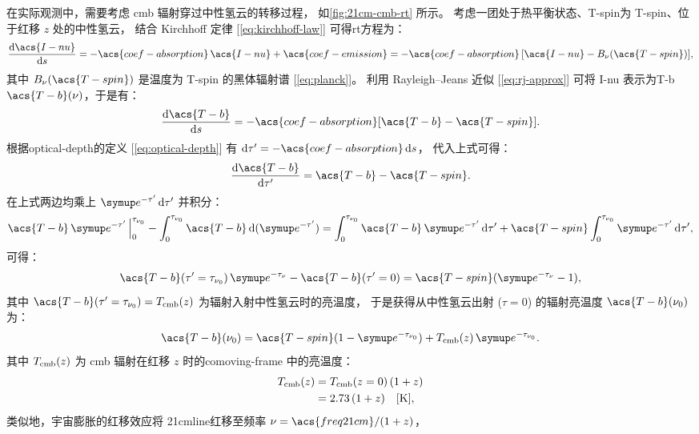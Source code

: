 在实际观测中，需要考虑 \ac{cmb} 辐射穿过中性氢云的转移过程，
如\autoref{fig:21cm-cmb-rt} 所示。
考虑一团处于热平衡状态、\acl{T-spin}为 \acs{T-spin}、位于红移 $z$ 处的中性氢云，
结合 Kirchhoff 定律 [\autoref{eq:kirchhoff-law}] 可得\ac{rt}方程为：
\begin{equation}
  \diff{\acs{I-nu}}{s}
    = -\acs{coef-absorption}\,\acs{I-nu} + \acs{coef-emission}
    = -\acs{coef-absorption}\,[\acs{I-nu} - B_{\nu}(\acs{T-spin})] ,
\end{equation}
其中
$B_{\nu}(\acs{T-spin})$ 是温度为 \acs{T-spin} 的黑体辐射谱 [\autoref{eq:planck}]。
利用 Rayleigh--Jeans 近似 [\autoref{eq:rj-approx}]
可将 \acs{I-nu} 表示为\acl{T-b} $\acs{T-b}(\nu)$，于是有：
\begin{equation}
  \diff{\acs{T-b}}{s}
    = -\acs{coef-absorption} [\acs{T-b} - \acs{T-spin}] .
\end{equation}
根据\acl{optical-depth}的定义 [\autoref{eq:optical-depth}]
有 $\D{\tau'} = -\acs{coef-absorption}\,\D{s}$，
代入上式可得：
\begin{equation}
  \diff{\acs{T-b}}{\tau'} = \acs{T-b} - \acs{T-spin} .
\end{equation}
在上式两边均乘上 $\Ce^{-\tau'}\,\D{\tau'}$ 并积分：
\begin{equation}
  \acs{T-b}\,\Ce^{-\tau'}\,\Big|_0^{\tau_{\nu_0}}
      - \int_0^{\tau_{\nu_0}} \acs{T-b}\,\D{(\Ce^{-\tau'})}
    = \int_0^{\tau_{\nu_0}} \acs{T-b}\,\Ce^{-\tau'}\,\D{\tau'}
      + \acs{T-spin} \int_0^{\tau_{\nu_0}} \Ce^{-\tau'}\,\D{\tau'} ,
\end{equation}
可得：
\begin{equation}
  \acs{T-b}(\tau'=\tau_{\nu_0})\,\Ce^{-\tau_{\nu}} - \acs{T-b}(\tau'=0)
    = \acs{T-spin} (\Ce^{-\tau_{\nu}} - 1) ,
\end{equation}
其中 $\acs{T-b}(\tau'=\tau_{\nu_0}) = T_{\R{cmb}}(z)$
为辐射入射中性氢云时的亮温度，
于是获得从中性氢云出射 ($\tau = 0$) 的辐射亮温度 $\acs{T-b}(\nu_0)$ 为：
\begin{equation}
  \acs{T-b}(\nu_0)
    = \acs{T-spin} (1 - \Ce^{-\tau_{\nu_0}})
      + T_{\R{cmb}}(z) \,\Ce^{-\tau_{\nu_0}} .
\end{equation}
其中 $T_{\mathrm{cmb}}(z)$ 为 \ac{cmb} 辐射在红移 $z$ 时的\ac{comoving-frame}
中的亮温度：
\begin{align}
  T_{\mathrm{cmb}}(z)
    & = T_{\mathrm{cmb}}(z=0)\,(1+z)  \\
    & = 2.73 \,(1+z) \quad [\si{\kelvin}] ,
\end{align}
类似地，宇宙膨胀的红移效应将 \ac{21cmline}红移至频率
$\nu = \acs{freq21cm}/(1+z)$，
